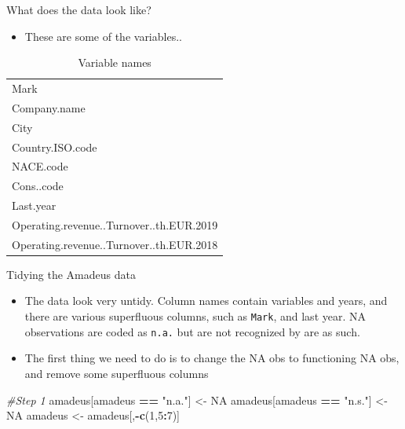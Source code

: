 \documentclass[10pt,ignorenonframetext,]{beamer}
\newenvironment{Shaded}{\begin{snugshade}}{\end{snugshade}}
\newcommand{\CommentTok}[1]{\textcolor[rgb]{0.56,0.35,0.01}{\textit{#1}}}
\newcommand{\DecValTok}[1]{\textcolor[rgb]{0.00,0.00,0.81}{#1}}
\newcommand{\KeywordTok}[1]{\textcolor[rgb]{0.13,0.29,0.53}{\textbf{#1}}}
\newcommand{\NormalTok}[1]{#1}
\newcommand{\OperatorTok}[1]{\textcolor[rgb]{0.81,0.36,0.00}{\textbf{#1}}}
\newcommand{\OtherTok}[1]{\textcolor[rgb]{0.56,0.35,0.01}{#1}}
\newcommand{\StringTok}[1]{\textcolor[rgb]{0.31,0.60,0.02}{#1}}
\providecommand{\tightlist}{%
  \setlength{\itemsep}{0pt}\setlength{\parskip}{0pt}}
\begin{document}
\begin{frame}{What does the data look like?}
\protect\hypertarget{what-does-the-data-look-like}{}

\begin{itemize}
\tightlist
\item
  These are some of the variables..
\end{itemize}

\begin{table}

\caption{\label{tab:unnamed-chunk-19}Variable names}
\centering
\begin{tabular}[t]{l}
\toprule
\\
\midrule
\rowcolor{gray!6}  Mark\\
Company.name\\
\rowcolor{gray!6}  City\\
Country.ISO.code\\
\rowcolor{gray!6}  NACE.code\\
\addlinespace
Cons..code\\
\rowcolor{gray!6}  Last.year\\
Operating.revenue..Turnover..th.EUR.2019\\
\rowcolor{gray!6}  Operating.revenue..Turnover..th.EUR.2018\\
\bottomrule
\end{tabular}
\end{table}

\end{frame}

\begin{frame}[fragile]{Tidying the Amadeus data}
\protect\hypertarget{tidying-the-amadeus-data}{}

\begin{itemize}
\item
  The data look very untidy. Column names contain variables and years,
  and there are various superfluous columns, such as \texttt{Mark}, and
  last year. NA observations are coded as \texttt{n.a.} but are not
  recognized by are as such.
\item
  The first thing we need to do is to change the NA obs to functioning
  NA obs, and remove some superfluous columns
\end{itemize}

\begin{Shaded}
\begin{Highlighting}[]
\CommentTok{#Step 1}
\NormalTok{amadeus[amadeus }\OperatorTok{==}\StringTok{ "n.a."}\NormalTok{] <-}\StringTok{ }\OtherTok{NA}
\NormalTok{amadeus[amadeus }\OperatorTok{==}\StringTok{ "n.s."}\NormalTok{] <-}\StringTok{ }\OtherTok{NA}
\NormalTok{amadeus <-}\StringTok{ }\NormalTok{amadeus[,}\OperatorTok{-}\KeywordTok{c}\NormalTok{(}\DecValTok{1}\NormalTok{,}\DecValTok{5}\OperatorTok{:}\DecValTok{7}\NormalTok{)]}
\end{Highlighting}
\end{Shaded}

\end{frame}
\end{document}
